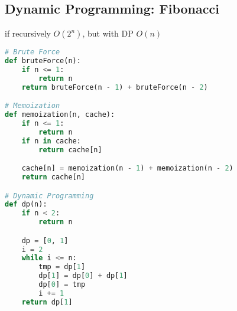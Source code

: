 \documentclass[english, threecolumn]{latex4ei/latex4ei_sheet}
\begin{document}
\begin{sectionbox}
\subsection{Dynamic Programming: Fibonacci}
if recursively $O(2^n)$, but with DP $O(n)$
\begin{lstlisting}[language=python, gobble=0]
# Brute Force
def bruteForce(n):
    if n <= 1:
        return n
    return bruteForce(n - 1) + bruteForce(n - 2)

# Memoization
def memoization(n, cache):
    if n <= 1:
        return n
    if n in cache:
        return cache[n]

    cache[n] = memoization(n - 1) + memoization(n - 2)
    return cache[n]

# Dynamic Programming
def dp(n):
    if n < 2:
        return n

    dp = [0, 1]
    i = 2
    while i <= n:
        tmp = dp[1]
        dp[1] = dp[0] + dp[1]
        dp[0] = tmp
        i += 1
    return dp[1]
\end{lstlisting}
\end{sectionbox}
\end{document}
